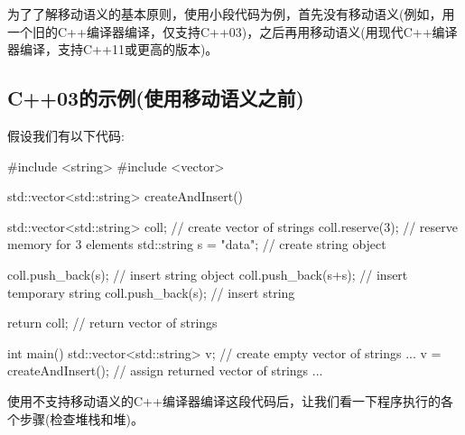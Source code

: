 为了了解移动语义的基本原则，使用小段代码为例，首先没有移动语义(例如，用一个旧的C++编译器编译，仅支持C++03)，之后再用移动语义(用现代C++编译器编译，支持C++11或更高的版本)。

\subsection{C++03的示例(使用移动语义之前)}

假设我们有以下代码:

\begin{cppcode}
#include <string>
#include <vector>

std::vector<std::string> createAndInsert()
{
	std::vector<std::string> coll; // create vector of strings
	coll.reserve(3); // reserve memory for 3 elements
	std::string s = "data"; // create string object
	
	coll.push_back(s); // insert string object
	coll.push_back(s+s); // insert temporary string
	coll.push_back(s); // insert string
	
	return coll; // return vector of strings
}

int main()
{
	std::vector<std::string> v; // create empty vector of strings
	...
	v = createAndInsert(); // assign returned vector of strings
	...
}
\end{cppcode}

使用不支持移动语义的C++编译器编译这段代码后，让我们看一下程序执行的各个步骤(检查堆栈和堆)。


